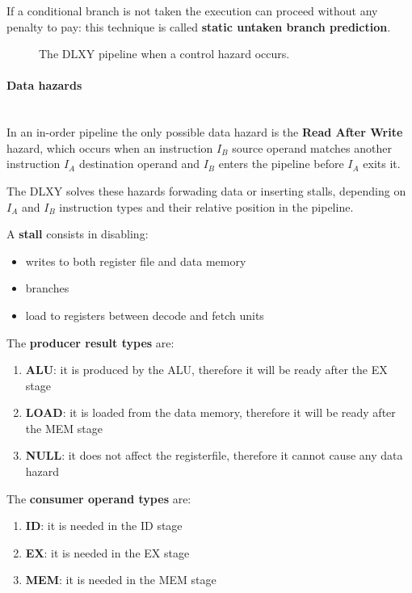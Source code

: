 \bigskip
If a conditional branch is not taken the execution can proceed without any
penalty to pay: this technique is called \textbf{static untaken branch prediction}.

\begin{figure}[H]
	\centering
	\caption{The DLXY pipeline when a control hazard occurs.}
	\label{fig:ctrl_hazard}
\end{figure}

\paragraph{Data hazards} \mbox{} \\
In an in-order pipeline the only possible data hazard is the \textbf{Read After
Write} hazard, which occurs when an instruction $I_B$ source operand matches
another instruction $I_A$ destination operand and $I_B$ enters the pipeline
before $I_A$ exits it.

\bigskip
The DLXY solves these hazards forwading data or inserting stalls, depending on
$I_A$ and $I_B$ instruction types and their relative position in the pipeline.

\bigskip
A \textbf{stall} consists in disabling:
\begin{itemize}
	\item writes to both register file and data memory
	\item branches
	\item load to registers between decode and fetch units
\end{itemize}

\bigskip
The \textbf{producer result types} are:
\begin{enumerate}
	\item \textbf{ALU}: it is produced by the ALU, therefore it will be
		ready after the EX stage
	\item \textbf{LOAD}: it is loaded from the data memory, therefore it
		will be ready after the MEM stage
	\item \textbf{NULL}: it does not affect the registerfile, therefore it
		cannot cause any data hazard
\end{enumerate}

\bigskip
The \textbf{consumer operand types} are:
\begin{enumerate}
	\item \textbf{ID}: it is needed in the ID stage
	\item \textbf{EX}: it is needed in the EX stage
	\item \textbf{MEM}: it is needed in the MEM stage
\end{enumerate}

